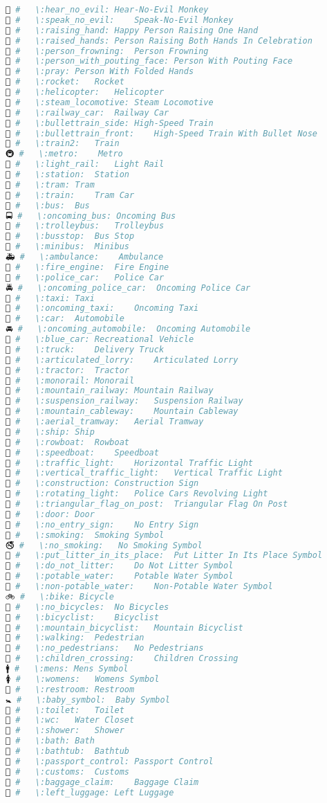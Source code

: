 \begin{lstlisting}[language=Julia]
🙉 #   \:hear_no_evil: Hear-No-Evil Monkey
🙊 #   \:speak_no_evil:    Speak-No-Evil Monkey
🙋 #   \:raising_hand: Happy Person Raising One Hand
🙌 #   \:raised_hands: Person Raising Both Hands In Celebration
🙍 #   \:person_frowning:  Person Frowning
🙎 #   \:person_with_pouting_face: Person With Pouting Face
🙏 #   \:pray: Person With Folded Hands
🚀 #   \:rocket:   Rocket
🚁 #   \:helicopter:   Helicopter
🚂 #   \:steam_locomotive: Steam Locomotive
🚃 #   \:railway_car:  Railway Car
🚄 #   \:bullettrain_side: High-Speed Train
🚅 #   \:bullettrain_front:    High-Speed Train With Bullet Nose
🚆 #   \:train2:   Train
🚇 #   \:metro:    Metro
🚈 #   \:light_rail:   Light Rail
🚉 #   \:station:  Station
🚊 #   \:tram: Tram
🚋 #   \:train:    Tram Car
🚌 #   \:bus:  Bus
🚍 #   \:oncoming_bus: Oncoming Bus
🚎 #   \:trolleybus:   Trolleybus
🚏 #   \:busstop:  Bus Stop
🚐 #   \:minibus:  Minibus
🚑 #   \:ambulance:    Ambulance
🚒 #   \:fire_engine:  Fire Engine
🚓 #   \:police_car:   Police Car
🚔 #   \:oncoming_police_car:  Oncoming Police Car
🚕 #   \:taxi: Taxi
🚖 #   \:oncoming_taxi:    Oncoming Taxi
🚗 #   \:car:  Automobile
🚘 #   \:oncoming_automobile:  Oncoming Automobile
🚙 #   \:blue_car: Recreational Vehicle
🚚 #   \:truck:    Delivery Truck
🚛 #   \:articulated_lorry:    Articulated Lorry
🚜 #   \:tractor:  Tractor
🚝 #   \:monorail: Monorail
🚞 #   \:mountain_railway: Mountain Railway
🚟 #   \:suspension_railway:   Suspension Railway
🚠 #   \:mountain_cableway:    Mountain Cableway
🚡 #   \:aerial_tramway:   Aerial Tramway
🚢 #   \:ship: Ship
🚣 #   \:rowboat:  Rowboat
🚤 #   \:speedboat:    Speedboat
🚥 #   \:traffic_light:    Horizontal Traffic Light
🚦 #   \:vertical_traffic_light:   Vertical Traffic Light
🚧 #   \:construction: Construction Sign
🚨 #   \:rotating_light:   Police Cars Revolving Light
🚩 #   \:triangular_flag_on_post:  Triangular Flag On Post
🚪 #   \:door: Door
🚫 #   \:no_entry_sign:    No Entry Sign
🚬 #   \:smoking:  Smoking Symbol
🚭 #   \:no_smoking:   No Smoking Symbol
🚮 #   \:put_litter_in_its_place:  Put Litter In Its Place Symbol
🚯 #   \:do_not_litter:    Do Not Litter Symbol
🚰 #   \:potable_water:    Potable Water Symbol
🚱 #   \:non-potable_water:    Non-Potable Water Symbol
🚲 #   \:bike: Bicycle
🚳 #   \:no_bicycles:  No Bicycles
🚴 #   \:bicyclist:    Bicyclist
🚵 #   \:mountain_bicyclist:   Mountain Bicyclist
🚶 #   \:walking:  Pedestrian
🚷 #   \:no_pedestrians:   No Pedestrians
🚸 #   \:children_crossing:    Children Crossing
🚹 #   \:mens: Mens Symbol
🚺 #   \:womens:   Womens Symbol
🚻 #   \:restroom: Restroom
🚼 #   \:baby_symbol:  Baby Symbol
🚽 #   \:toilet:   Toilet
🚾 #   \:wc:   Water Closet
🚿 #   \:shower:   Shower
🛀 #   \:bath: Bath
🛁 #   \:bathtub:  Bathtub
🛂 #   \:passport_control: Passport Control
🛃 #   \:customs:  Customs
🛄 #   \:baggage_claim:    Baggage Claim
🛅 #   \:left_luggage: Left Luggage  
\end{lstlisting}